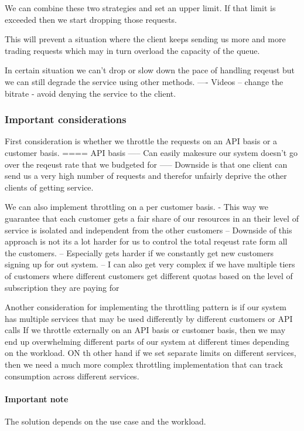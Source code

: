We can combine these two strategies and set an upper limit.
If that limit is exceeded then we start dropping those requests.

This will prevent a situation where the client keeps sending us more and more trading requests which may in turn overload the capacity of the queue.

In certain situation we can't drop or slow down the pace of handling reqeust but we can still degrade the service using other methods.
---- Videos -- change the bitrate - avoid denying the service to the client.

\subsubsection{Important considerations}
First consideration is whether we throttle the requests on an API basis or a customer basis.
==== API basis
----- Can easily makesure our system doesn't go over the reqeust rate that we budgeted for
----- Downside is that one client can send us a very high number of requests and therefor unfairly deprive the other clients of getting service.

We can also implement throttling on a per customer basis.
- This way we guarantee that each customer gets a fair share of our resources in an their level of service is isolated and independent from the other customers
-- Downside of this approach is not its a lot harder for us to control the total reqeust rate form all the customers.
-- Especially gets harder if we constantly get new customers signing up for out system.
-- I can also get very complex if we have multiple tiers of customers where different customers get different quotas based on the level of subscription they are paying for

Another consideration for implementing the throttling pattern is if our system has multiple services that may be used differently by different customers or API calls
If we throttle externally on an API basis or customer basis, then we may end up overwhelming different parts of our system at different times depending on the workload.
ON th other hand if we set separate limits on different services, then we need a much more complex throttling implementation that can track consumption across different services.

\paragraph{Important note}
The solution depends on the use case and the workload.

